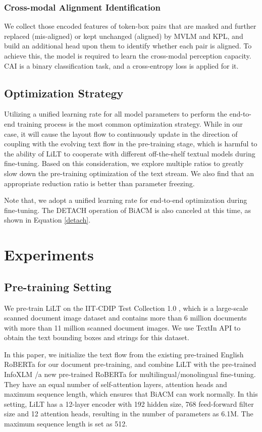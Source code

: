 \documentclass[11pt]{article}
\begin{document}
\subsubsection{Cross-modal Alignment Identification}
We collect those encoded features of token-box pairs that are masked and further replaced (mis-aligned) or kept unchanged (aligned) by MVLM and KPL, 
and build  an additional head upon them to identify whether each pair is aligned. To achieve this, the model is required to learn the cross-modal perception capacity. CAI is a binary classification task, and  a cross-entropy loss is applied for it.

\subsection{Optimization Strategy}
Utilizing a unified learning rate for all model parameters to perform the end-to-end training process is the most common optimization strategy. While in our case, 
it will cause the layout flow to continuously update in the direction of coupling with the evolving text flow in the pre-training stage, which is harmful to the  ability of LiLT to cooperate with different off-the-shelf  textual models during fine-tuning. Based on this consideration, we explore multiple ratios to greatly slow down  the pre-training optimization of the text stream.
We also find that an appropriate  reduction ratio is better than  parameter freezing.

Note that, we adopt a unified learning rate for end-to-end optimization during fine-tuning. The DETACH operation of BiACM is also canceled at this time, as shown in Equation \ref{detach}. 


\section{Experiments}
\subsection{Pre-training Setting}
We pre-train LiLT on the IIT-CDIP Test Collection 1.0 \cite{cdip}, which is a large-scale scanned document image dataset and contains more than 6 million documents with more than 11 million scanned document images. 
We  use TextIn API
to obtain the text bounding boxes and strings for this dataset. 
 
In this paper,
we initialize the text flow from the existing pre-trained English RoBERTa \cite{liu2019roberta} for our document pre-training,  and combine LiLT with the pre-trained  InfoXLM \cite{chi2021infoxlm}/a new pre-trained RoBERTa for multilingual/monolingual fine-tuning.
They have an equal number of self-attention layers, attention heads and maximum sequence length, 
which ensures that BiACM can work normally.  
In this  setting, LiLT  has a 12-layer encoder with 192 hidden size, 768 feed-forward filter size and 12 attention heads, resulting in the number of parameters as 6.1M. The maximum sequence length  is set as 512.
\end{document}
